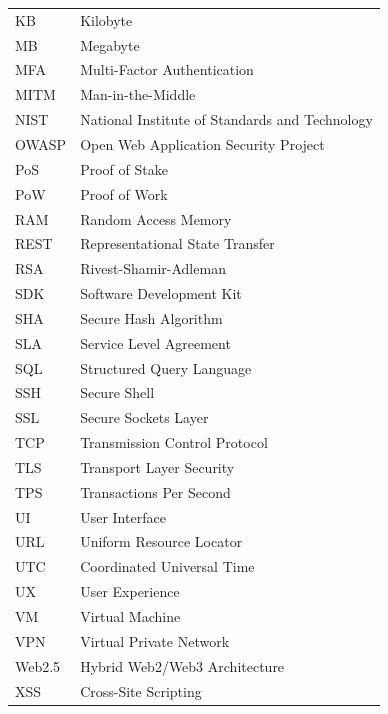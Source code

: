 \begin{longtable}{@{}p{3.5cm} p{12.5cm}@{}}
KB & Kilobyte \\
MB & Megabyte \\
MFA & Multi-Factor Authentication \\
MITM & Man-in-the-Middle \\
NIST & National Institute of Standards and Technology \\
OWASP & Open Web Application Security Project \\
PoS & Proof of Stake \\
PoW & Proof of Work \\
RAM & Random Access Memory \\
REST & Representational State Transfer \\
RSA & Rivest-Shamir-Adleman \\
SDK & Software Development Kit \\
SHA & Secure Hash Algorithm \\
SLA & Service Level Agreement \\
SQL & Structured Query Language \\
SSH & Secure Shell \\
SSL & Secure Sockets Layer \\
TCP & Transmission Control Protocol \\
TLS & Transport Layer Security \\
TPS & Transactions Per Second \\
UI & User Interface \\
URL & Uniform Resource Locator \\
UTC & Coordinated Universal Time \\
UX & User Experience \\
VM & Virtual Machine \\
VPN & Virtual Private Network \\
Web2.5 & Hybrid Web2/Web3 Architecture \\
XSS & Cross-Site Scripting \\

\bottomrule
\end{longtable}

\cleardoublepage
\mbox{}
\thispagestyle{empty}
\cleardoublepage